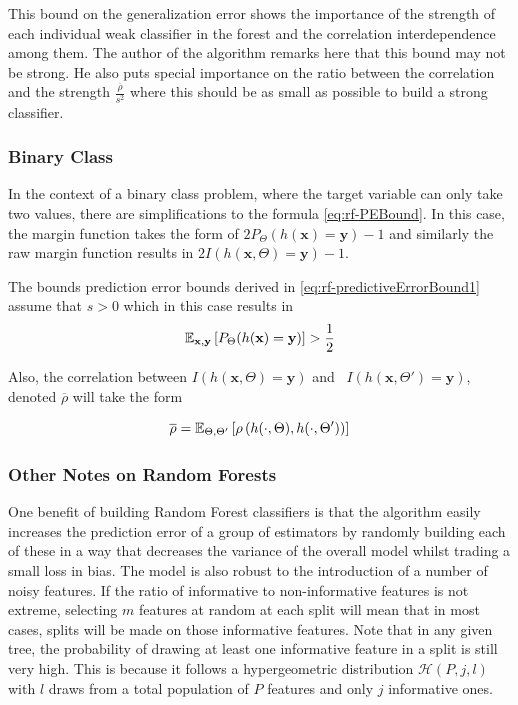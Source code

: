 This bound on the generalization error shows the importance of the strength of each individual weak classifier in the forest and the correlation interdependence among them. The author of the algorithm \textcite{breiman-randomforests} remarks here that this bound may not be strong. He also puts special importance on the ratio between the correlation and the strength $\frac{\overline{\rho}}{s^2}$ where this should be as small as possible to build a strong classifier.
\subsubsection{Binary Class}
In the context of a binary class problem, where the target variable can only take two values, there are simplifications to the formula \ref{eq:rf-PEBound}. In this case, the margin function takes the form of $2 P_{\Theta}(h(\textbf{x}) = \textbf{y}) -1$ and similarly the raw margin function results in $2 I(h(\textbf{x}, \Theta) = \textbf{y}) -1$.


The bounds prediction error bounds derived in \ref{eq:rf-predictiveErrorBound1} assume that $s >0$ which in this case results in
$$ \operatorname{\mathbb{E}}_{\textbf{x},\textbf{y}} \left[ P_{\Theta}(h(\textbf{x}) = \textbf{y}) \right] > \frac{1}{2} $$

Also, the correlation between $I(h(\textbf{x}, \Theta) = \textbf{y})$ and \  $I(h(\textbf{x}, \Theta') = \textbf{y})$, denoted $\overline{\rho}$ will take the form

$$ \overline{\rho} =  \operatorname{\mathbb{E}}_{\Theta,\Theta'} \left[ \rho \left( h(\cdot{},\Theta) ,h(\cdot{},\Theta') \right)   \right] $$

\subsubsection{Other Notes on Random Forests}
One benefit of building Random Forest classifiers is that the algorithm easily increases the prediction error of a group of estimators by randomly building each of these in a way that decreases the variance of the overall model whilst trading a small loss in bias. The model is also robust to the introduction of a number of noisy features. If the ratio of informative to non-informative features is not extreme, selecting $m$ features at random at each split will mean that in most cases, splits will be made on those informative features. Note that in any given tree, the probability of drawing at least one informative feature in a split is still very high. This is because it follows a hypergeometric distribution $\mathcal{H}(P,j,l)$ with $l$ draws from a total population of $P$ features and only $j$ informative ones.

